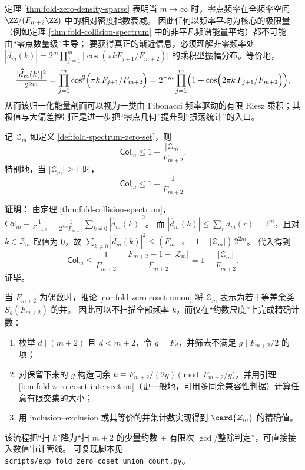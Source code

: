 \begin{remark}\label{rem:fold-zero-sparse-necessity}
定理 \ref{thm:fold-zero-density-sparse} 表明当 \(m\to\infty\) 时，零点频率在全频率空间 \(\ZZ/(F_{m+2}\ZZ)\) 中的相对密度指数衰减。
因此任何以频率平均为核心的极限量（例如定理 \ref{thm:fold-collision-spectrum} 中的非平凡频谱能量平均）都不可能由“零点数量级”主导；
要获得真正的渐近信息，必须理解非零频率处
\(
|\widehat d_m(k)|=2^m\prod_{j=1}^m\bigl|\cos(\pi kF_{j+1}/F_{m+2})\bigr|
\)
的乘积型振幅分布。等价地，
\[
\frac{|\widehat d_m(k)|^2}{2^{2m}}
=\prod_{j=1}^m\cos^2\Bigl(\pi k\,F_{j+1}/F_{m+2}\Bigr)
=2^{-m}\prod_{j=1}^m\Bigl(1+\cos\Bigl(2\pi k\,F_{j+1}/F_{m+2}\Bigr)\Bigr),
\]
从而该归一化能量剖面可以视为一类由 Fibonacci 频率驱动的有限 Riesz 乘积；其极值与大偏差控制正是进一步把“零点几何”提升到“振荡统计”的入口。
\end{remark}

\begin{theorem}[零点削减的碰撞上界]
\label{thm:fold-collision-zero-reduction}
记 $\mathcal{Z}_m$ 如定义 \ref{def:fold-spectrum-zero-set}，则
\[
\mathsf{Col}_m\le 1-\frac{|\mathcal{Z}_m|}{F_{m+2}}.
\]
特别地，当 $|\mathcal{Z}_m|\ge 1$ 时，
\[
\mathsf{Col}_m\le 1-\frac{1}{F_{m+2}}.
\]
\end{theorem}

\textbf{证明：}
由定理 \ref{thm:fold-collision-spectrum}，
\(
\mathsf{Col}_m-\frac{1}{F_{m+2}}=\frac{1}{2^{2m}F_{m+2}}\sum_{k\ne 0}|\widehat d_m(k)|^2
\)。
而 $|\widehat d_m(k)|\le\sum_r d_m(r)=2^m$，且对 $k\in\mathcal{Z}_m$ 取值为 0，故
\(
\sum_{k\ne 0}|\widehat d_m(k)|^2\le (F_{m+2}-1-|\mathcal{Z}_m|)\,2^{2m}
\)。
代入得到
\[
\mathsf{Col}_m
\le
\frac{1}{F_{m+2}}+\frac{F_{m+2}-1-|\mathcal{Z}_m|}{F_{m+2}}
=1-\frac{|\mathcal{Z}_m|}{F_{m+2}}.
\]
证毕。

\begin{remark}\label{rem:fold-zero-coset-algorithm}
当 \(F_{m+2}\) 为偶数时，推论 \ref{cor:fold-zero-coset-union} 将 \(\mathcal{Z}_m\) 表示为若干等差余类 \(S_g(F_{m+2})\) 的并。
因此可以不扫描全部频率 \(k\)，而仅在“约数尺度”上完成精确计数：
\begin{enumerate}
  \item 枚举 \(d\mid(m+2)\) 且 \(d<m+2\)，令 \(g=F_d\)，并筛去不满足 \(g\mid F_{m+2}/2\) 的项；
  \item 对保留下来的 \(g\) 构造同余 \(k\equiv F_{m+2}/(2g)\pmod{F_{m+2}/g}\)，并用引理 \ref{lem:fold-zero-coset-intersection}（更一般地，可用多同余兼容性判据）计算任意有限交集的大小；
  \item 用 inclusion--exclusion 或其等价的并集计数实现得到 \(\card{\mathcal{Z}_m}\) 的精确值。
\end{enumerate}
该流程把“扫 \(k\)”降为“扫 \(m+2\) 的少量约数 + 有限次 \(\gcd\)/整除判定”，可直接接入数值审计管线。
可复现脚本见 \texttt{scripts/exp\_fold\_zero\_coset\_union\_count.py}。
\end{remark}

